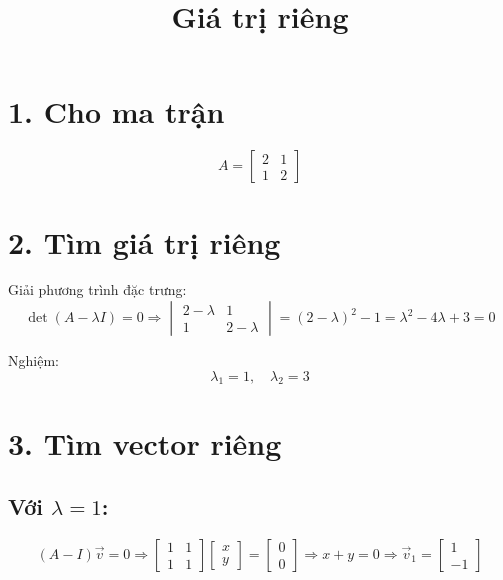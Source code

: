 \documentclass[12pt]{article}
\title{Giá trị riêng}
\author{}
\date{}
\begin{document}
\maketitle

\section*{1. Cho ma trận}
\[
A = \begin{bmatrix} 2 & 1 \\ 1 & 2 \end{bmatrix}
\]

\section*{2. Tìm giá trị riêng}

Giải phương trình đặc trưng:
\[
\det(A - \lambda I) = 0
\Rightarrow
\begin{vmatrix}
2 - \lambda & 1 \\
1 & 2 - \lambda
\end{vmatrix} = (2 - \lambda)^2 - 1 = \lambda^2 - 4\lambda + 3 = 0
\]

Nghiệm:
\[
\lambda_1 = 1, \quad \lambda_2 = 3
\]

\section*{3. Tìm vector riêng}

\subsection*{Với \( \lambda = 1 \):}
\[
(A - I)\vec{v} = 0 \Rightarrow
\begin{bmatrix}
1 & 1 \\
1 & 1
\end{bmatrix}
\begin{bmatrix}
x \\
y
\end{bmatrix}
= \begin{bmatrix}
0 \\
0
\end{bmatrix}
\Rightarrow x + y = 0 \Rightarrow \vec{v}_1 = \begin{bmatrix} 1 \\ -1 \end{bmatrix}
\]
\end{document}
